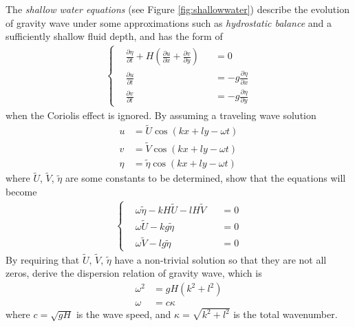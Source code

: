 \begin{Exercise}
\label{ex:shallowwater}
The \textit{shallow water equations} (see Figure \ref{fig:shallowwater}) describe the evolution of gravity wave under some approximations such as \textit{hydrostatic balance} and a sufficiently shallow fluid depth, and has the form of
\begin{align}
\left\{\begin{alignedat}{2}
&\frac{\partial \eta}{\partial t} + H(\frac{\partial u}{\partial x} + \frac{\partial v}{\partial y})& &= 0 \\
&\frac{\partial u}{\partial t}& &= -g\frac{\partial \eta}{\partial x} \\
&\frac{\partial v}{\partial t}& &= -g\frac{\partial \eta}{\partial y} 
\end{alignedat}\right.
\end{align}
when the Coriolis effect is ignored. By assuming a traveling wave solution
\begin{align*}
u &= \tilde{U} \cos(kx + ly - \omega t) \\
v &= \tilde{V} \cos(kx + ly - \omega t) \\
\eta &= \tilde{\eta} \cos(kx + ly - \omega t)
\end{align*}
where $\tilde{U}$, $\tilde{V}$, $\tilde{\eta}$ are some constants to be determined, show that the equations will become
\begin{align}
\left\{\begin{alignedat}{2}
&\omega \tilde{\eta} - kH \tilde{U} - lH \tilde{V}& &= 0 \\
&\omega \tilde{U} - kg \tilde{\eta}& &= 0 \\
&\omega \tilde{V} - lg \tilde{\eta}& &= 0
\end{alignedat}\right.
\end{align}
By requiring that $\tilde{U}$, $\tilde{V}$, $\tilde{\eta}$ have a non-trivial solution so that they are not all zeros, derive the dispersion relation of gravity wave, which is
\begin{align*}
\omega^2 &= gH(k^2 + l^2) \\
\omega &= c\kappa
\end{align*}
where $c = \sqrt{gH}$ is the wave speed, and $\kappa = \sqrt{k^2 + l^2}$ is the total wavenumber.
\end{Exercise}
